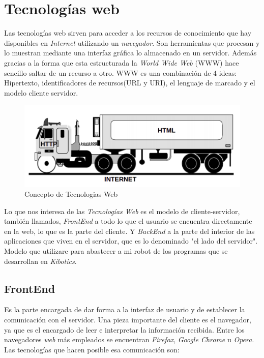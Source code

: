 \section{Tecnologías web}
\label{sec:web}
Las tecnologías web sirven para acceder a los recursos de conocimiento que hay disponibles en \textit{Internet} utilizando un \textit{navegador}. Son herramientas que procesan y lo muestran mediante una interfaz gráfica lo almacenado en un servidor. Además gracias a la forma que esta estructurada la \textit{World Wide Web} (WWW) hace sencillo saltar de un recurso a otro. 
WWW es una combinación de 4 ideas: Hipertexto, identificadores de recursos(URL y URI), el lenguaje de marcado y el modelo cliente servidor.

\begin{figure}[h]
\centering
\includegraphics[scale=0.4]{img/tecnologiasweb.png}
\caption{Concepto de Tecnologias Web} \label{fig:tecnologiasweb}
\end{figure}

Lo que nos interesa de las \textit{Tecnologías Web} es el modelo de cliente-servidor, también llamados, \textit{FrontEnd} a todo lo que el usuario se encuentra directamente en la web, lo que es la parte del cliente. Y \textit{BackEnd} a la parte del interior de las aplicaciones que viven en el servidor, que es lo denominado "el lado del servidor". Modelo que utilizare para abastecer a mi robot de los programas que se desarrollan en \textit{Kibotics}.
\subsection{FrontEnd}
\label{subsec:frontend} 
Es la parte encargada de dar forma a la interfaz de usuario y de establecer la comunicación con el servidor. Una pieza importante del cliente es el navegador, ya que es el encargado de leer e interpretar la información recibida. Entre los navegadores \textit{web} más empleados se encuentran \textit{Firefox}, \textit{Google Chrome} u \textit{Opera}\cite{bib:navegadores}. Las tecnologías que hacen posible esa comunicación son: 

